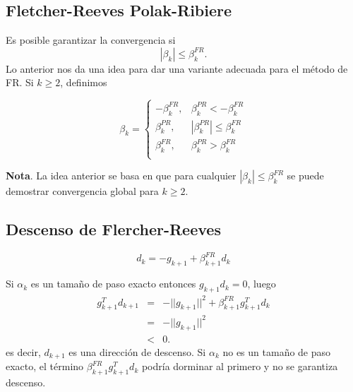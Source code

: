 \documentclass[11pt,letterpaper]{article}
\theoremstyle{definition}
\theoremstyle{definition}
\theoremstyle{definition}
\begin{document}
\subsection{Fletcher-Reeves Polak-Ribiere}
Es posible garantizar la convergencia si 
\[ | \beta_k | \leq \beta_k^{FR}. \]
Lo anterior nos da una idea para dar una variante adecuada para el método de FR. Si $ k \geq 2 $, definimos
\begin{shaded*}
	\begin{equation}
		\beta_k = \left\{\begin{matrix}
					- \beta_k^{FR}, & \beta_k^{PR} < - \beta_k^{FR} \\
					\beta_k^{PR}, & |\beta_k^{PR}| \leq \beta_k^{FR} \\
					\beta_k^{FR}, & \beta_k^{PR} > \beta_k^{FR} \\
					\end{matrix}\right.
	\end{equation}
\end{shaded*}
\textbf{Nota}. La idea anterior se basa en que para cualquier
$ | \beta_k | \leq \beta_k^{FR} $ se puede demostrar convergencia global para
$ k \geq 2 $.

\subsection{Descenso de Flercher-Reeves}
\begin{shaded*}
	\begin{equation*}
	d_k = - g_{k+1} + \beta_{k+1}^{FR} d_k
	\end{equation*}
\end{shaded*}
Si $ \alpha_k $ es un tamaño de paso exacto entonces $ g_{k+1} d_k = 0 $, luego
\begin{eqnarray*}
	g_{k+1}^T d_{k+1} & = &  - || g_{k+1} ||^2 + \beta_{k+1}^{FR} g_{k+1}^T d_k \\
					  & = & - || g_{k+1} ||^2 \\
					  & < & 0.
\end{eqnarray*}
es decir, $ d_{k+1} $ es una dirección de descenso. Si $ \alpha_k $ no es un tamaño de paso exacto, el término $ \beta_{k+1}^{FR} g_{k+1}^T d_k  $ podría dorminar al primero y no se garantiza descenso.
\end{document}
